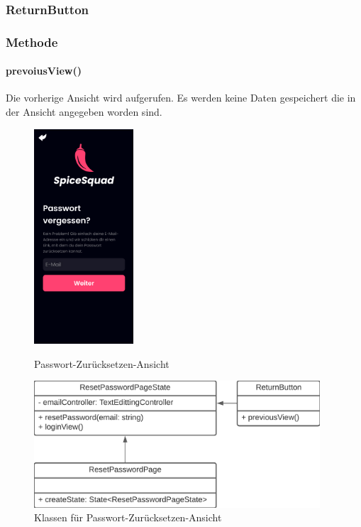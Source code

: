 \documentclass[parskip=full]{scrartcl}
\begin{document}
    \subsubsection{ReturnButton} \label{sec:ReturnButton} 
        \subsubsection*{Methode}
            \paragraph*{prevoiusView()} Die vorherige Ansicht wird aufgerufen. Es werden keine Daten gespeichert die in der Ansicht angegeben worden sind.
    
            \begin{figure}[htp]
                \begin{minipage}
                    [t]{0.49\textwidth}
                    \centering
                    \includegraphics[height=80mm]{images/Presentation-layer/PasswordResetView.jpg}
                    \caption{Passwort-Zurücksetzen-Ansicht}
                \end{minipage}
                \begin{minipage}
                    [t]{0.49\textwidth}
                    \centering
                    \includegraphics[width=0.95\textwidth]{images/Presentation-layer/PasswordResetViewClass.png}
                    \caption{Klassen für Passwort-Zurücksetzen-Ansicht}
                \end{minipage}
            \end{figure}    
        
\end{document}
